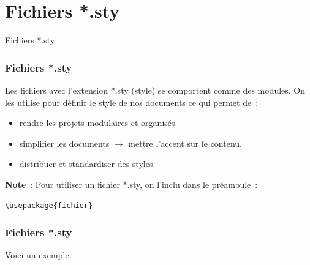 
\section{Fichiers *.sty}

\begin{frame}
    \vfill
    \begin{center}
        \large
        Fichiers *.sty
    \end{center}
    \vfill
\end{frame}

\begin{frame}[fragile]
    \frametitle{Fichiers *.sty}
    Les fichiers avec l'extension \textcolor{vibrant_green}{*.sty (style)} se comportent comme des modules. On les utilise pour définir le style de nos documents ce qui permet de~:
    \vspace{0.3cm}
    \pause
    \begin{itemize}
        \item[$\diamond$] rendre les projets modulaires et organisés.
        \pause
        \item[$\diamond$] simplifier les documents $\to$ mettre l'accent sur le contenu.
        \pause
        \item[$\diamond$] distribuer et standardiser des styles.
    \end{itemize}
    \vfill
    \pause
    \begin{mybrownbox}
        \textbf{Note}~: Pour utiliser un fichier \textcolor{vibrant_green}{*.sty}, on l'inclu
        dans le préambule~:
        \begin{lstlisting}[xleftmargin=0mm]
            \usepackage{fichier}
        \end{lstlisting}
    \end{mybrownbox}
\end{frame}

\begin{frame}
    \frametitle{Fichiers *.sty}
    \vfill
    \begin{center}
        \large
        Voici un \href{https://github.com/antoinedelagrave/UniTeX/blob/main/Classic/style.sty}{\textcolor{lila_links}{exemple}.}
    \end{center}
    \vfill
\end{frame}
